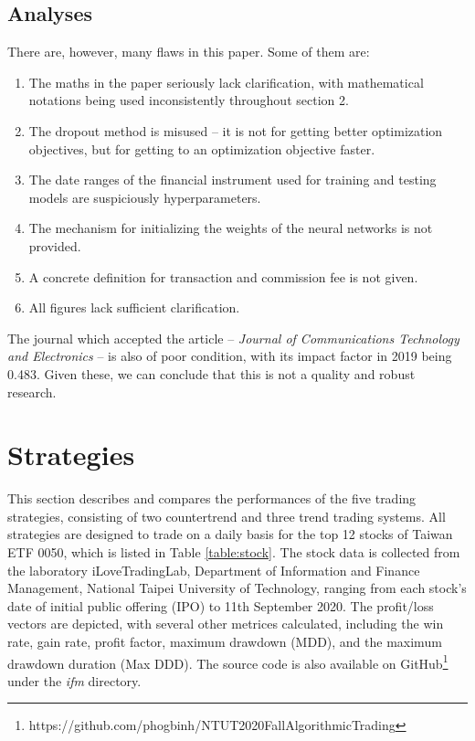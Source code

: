 \documentclass[12pt, letterpaper, oneside]{article}
\begin{document}
\subsection{Analyses}
There are, however, many flaws in this paper. Some of them are:
\begin{enumerate}
    \item The maths in the paper seriously lack clarification, with mathematical notations being used inconsistently throughout section 2.
    \item The dropout method is misused -- it is not for getting better optimization objectives, but for getting to an optimization objective faster.
    \item The date ranges of the financial instrument used for training and testing models are suspiciously hyperparameters.
    \item The mechanism for initializing the weights of the neural networks is not provided.
    \item A concrete definition for transaction and commission fee is not given.
    \item All figures lack sufficient clarification.
\end{enumerate}
The journal which accepted the article -- \textit{Journal of Communications Technology and Electronics} -- is also of poor condition, with its impact factor in 2019 being 0.483\cite{comtech}. Given these, we can conclude that this is not a quality and robust research.

\section{Strategies}
This section describes and compares the performances of the five trading strategies, consisting of two countertrend and three trend trading systems. All strategies are designed to trade on a daily basis for the top 12 stocks of Taiwan ETF 0050, which is listed in Table \ref{table:stock}. The stock data is collected from the laboratory iLoveTradingLab, Department of Information and Finance Management, National Taipei University of Technology, ranging from each stock's date of initial public offering (IPO) to 11th September 2020. The profit/loss vectors are depicted, with several other metrices calculated, including the win rate, gain rate, profit factor, maximum drawdown (MDD), and the maximum drawdown duration (Max DDD). The source code is also available on GitHub\footnote{https://github.com/phogbinh/NTUT2020FallAlgorithmicTrading} under the \textit{ifm} directory.
\end{document}
